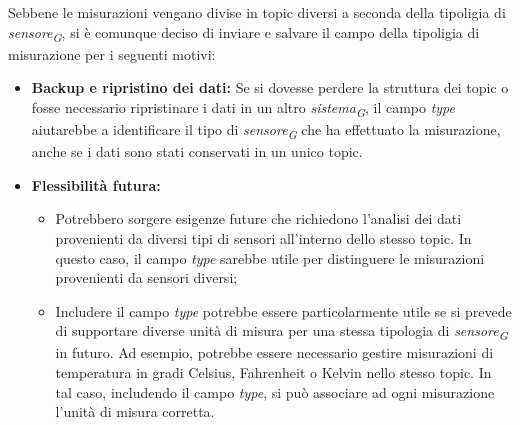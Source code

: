Sebbene le misurazioni vengano divise in topic diversi a seconda della tipoligia di \textit{sensore}\textsubscript{\textit{G}}, si è comunque deciso di inviare e salvare il campo della tipoligia di misurazione per i seguenti motivi:
\begin{itemize}
    \item \textbf{Backup e ripristino dei dati:} Se si dovesse perdere la struttura dei topic o fosse necessario ripristinare i dati in un altro \textit{sistema}\textsubscript{\textit{G}}, il campo \textit{type} aiutarebbe a identificare il tipo di \textit{sensore}\textsubscript{\textit{G}} che ha effettuato la misurazione, anche se i dati sono stati conservati in un unico topic.
    \item \textbf{Flessibilità futura:} 
    \begin{itemize}
        \item Potrebbero sorgere esigenze future che richiedono l'analisi dei dati provenienti da diversi tipi di sensori all'interno dello stesso topic. In questo caso, il campo \textit{type} sarebbe utile per distinguere le misurazioni provenienti da sensori diversi;
        \item Includere il campo \textit{type} potrebbe essere particolarmente utile se si prevede di supportare diverse unità di misura per una stessa tipologia di \textit{sensore}\textsubscript{\textit{G}} in futuro. Ad esempio, potrebbe essere necessario gestire misurazioni di temperatura in gradi Celsius, Fahrenheit o Kelvin nello stesso topic. In tal caso, includendo il campo \textit{type}, si può associare ad ogni misurazione l'unità di misura corretta.
    \end{itemize}
\end{itemize}
